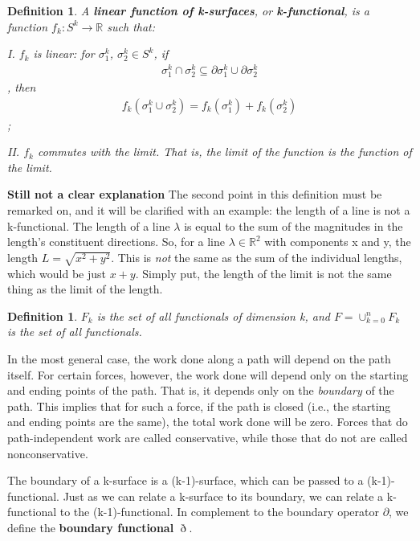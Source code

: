 \documentclass{book}
\newtheorem{defn}[equation]{Definition}
\begin{document}
\begin{defn}
	A \textbf{linear function of k-surfaces}, or \textbf{k-functional}, is a function $f_k : S^k \to \mathbb{R}$ such that:
	
	I. $f_k$ is linear: for $\sigma^k_1$, $\sigma^k_2 \in S^k$, if \begin{gather}\sigma^k_1 \cap \sigma^k_2 \subseteq \partial \sigma^k_1 \cup \partial \sigma^k_2\end{gather}, then \begin{gather}f_k(\sigma^k_1\cup \sigma^k_2) = f_k(\sigma^k_1) + f_k(\sigma^k_2) \end{gather};
	
	II. $f_k$ commutes with the limit. That is, the limit of the function is the function of the limit. 
\end{defn}

\textbf{Still not a clear explanation}
The second point in this definition must be remarked on, and it will be clarified with an example: the length of a line is not a k-functional. The length of a line $\lambda$ is equal to the sum of the magnitudes in the length's constituent directions. So, for a line $\lambda \in \mathbb{R}^2$ with components x and y, the length $L = \sqrt{x^2 + y^2}$. This is \emph{not} the same as the sum of the individual lengths, which would be just $x + y$. Simply put, the length of the limit is not the same thing as the limit of the length. 


\begin{defn}
	$F_k$ is the set of all functionals of dimension k, and $F = \cup_{k=0}^nF_k$ is the set of all functionals. 
\end{defn}


In the most general case, the work done along a path will depend on the path itself. For certain forces, however, the work done will depend only on the starting and ending points of the path. That is, it depends only on the \emph{boundary} of the path. This implies that for such a force, if the path is closed (i.e., the starting and ending points are the same), the total work done will be zero. Forces that do path-independent work are called conservative, while those that do not are called nonconservative. 

The boundary of a k-surface is a (k-1)-surface, which can be passed to a (k-1)-functional. Just as we can relate a k-surface to its boundary, we can relate a k-functional to the (k-1)-functional. In complement to the boundary operator $\partial$, we define the \textbf{boundary functional} $\eth$. 
\end{document}
